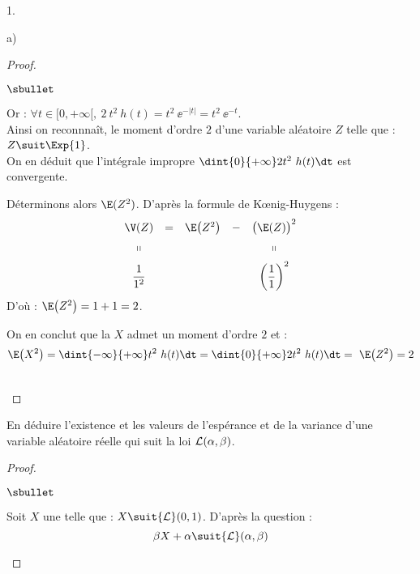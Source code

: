 \documentclass[11pt]{article}%
\begin{document}
\begin{noliste}{1.}
\begin{noliste}{a)}
\begin{proof}
\begin{noliste}{$\sbullet$}
      \item Or : $\forall t \in [0, +\infty[, \ 2 \ t^2 \ h(t) = t^2 \
        \ee^{-|t|} = t^2 \ \ee^{-t}$.\\
        Ainsi on reconnnaît, le moment d'ordre $2$ d'une variable
        aléatoire $Z$ telle que : $Z \suit \Exp{1}$.\\[.1cm]
        On en déduit que l'intégrale impropre $\dint{0}{+\infty} 2 t^2
        \ h(t) \dt$ est convergente.

      \item Déterminons alors $\E(Z^2)$. D'après la formule de
        K\oe{}nig-Huygens :
        \[
        \begin{array}{ccccc}
          \V(Z) & = & \E\big( Z^2 \big) & - & \big( \E(Z) \big)^2 
          \\[.2cm]
          \shortparallel & & & & \shortparallel
          \\[.2cm]
          \dfrac{1}{1^2} & & & & \left( \dfrac{1}{1} \right)^2
        \end{array}
        \]
        D'où : $\E\big( Z^2 \big) = 1 + 1 = 2$.

      \item On en conclut que la \var $X$ admet un moment d'ordre $2$
        et :
        \[
        \E\big( X^2 \big) = \dint{-\infty}{+\infty} t^2 \ h(t) \dt =
        \dint{0}{+\infty} 2 t^2 \ h(t) \dt = \ \E\big( Z^2 \big) = 2
        \]
      \end{noliste}
      ~\\[-1.2cm]
    \end{proof}

  \item En déduire l'existence et les valeurs de l'espérance et de la
    variance d'une variable aléatoire réelle qui suit la loi ${\cal
      L}(\alpha,\beta)$.

    \begin{proof}~
      \begin{noliste}{$\sbullet$}
      \item Soit $X$ une \var telle que : $X \suit {\cal L}(0,
        1)$. D'après la question  :
        \[
        \beta X + \alpha \suit {\cal L}(\alpha, \beta)
        \]
        
        
        
        

\end{noliste}
\end{proof}
\end{noliste}
\end{noliste}
\end{document}
